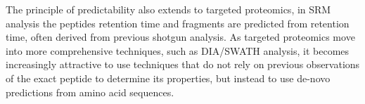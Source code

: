 \documentclass[a4paper]{article}
\begin{document}
The principle of predictability also extends to targeted proteomics,
in SRM analysis the peptides retention time and fragments are
predicted from retention time, often derived from previous shotgun
analysis. As targeted proteomics move into more comprehensive
techniques, such as DIA/SWATH analysis, it becomes increasingly
attractive to use techniques that do not rely on previous observations
of the exact peptide to determine its properties, but instead to use
de-novo predictions from amino acid sequences.   




\end{document}
